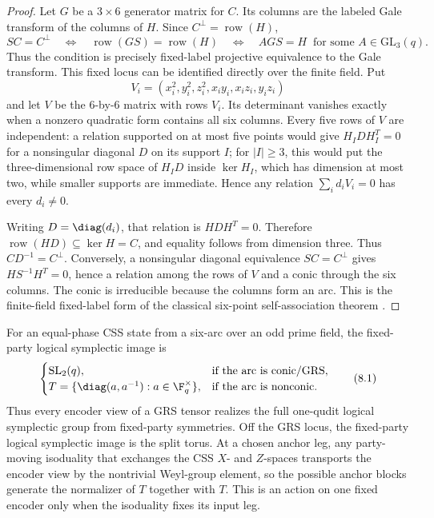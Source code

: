 \begin{proof}
Let \(G\) be a \(3\times6\) generator matrix for \(C\).  Its columns are
the labeled Gale transform of the columns of \(H\).  Since
\(C^\perp=\operatorname{row}(H)\),
\[
 SC=C^\perp
 \quad\Longleftrightarrow\quad
 \operatorname{row}(GS)=\operatorname{row}(H)
 \quad\Longleftrightarrow\quad
 AGS=H\ \text{ for some }A\in\mathrm{GL}_3(q).
\]
Thus the condition is precisely fixed-label projective equivalence to the
Gale transform.  This fixed locus can be identified directly over the
finite field.  Put
\[
 V_i=(x_i^2,y_i^2,z_i^2,x_iy_i,x_iz_i,y_iz_i)
\]
and let \(V\) be the \(6\)-by-\(6\) matrix with rows \(V_i\).
Its determinant vanishes exactly when a nonzero quadratic form contains
all six columns.  Every five rows of \(V\) are independent: a relation
supported on at most five points would give
\(H_I D H_I^T=0\) for a nonsingular diagonal \(D\) on its support \(I\);
for \(|I|\geq3\), this would put the three-dimensional row space of
\(H_I D\) inside \(\ker H_I\), which has dimension at most two, while
smaller supports are immediate.  Hence any relation
\(\sum_i d_i V_i=0\) has every \(d_i\ne0\).

Writing \(D=\diag(d_i)\), that relation is \(HDH^T=0\).  Therefore
\(\operatorname{row}(HD)\subseteq\ker H=C\), and equality follows from
dimension three.  Thus \(CD^{-1}=C^\perp\).  Conversely, a nonsingular
diagonal equivalence \(SC=C^\perp\) gives
\(HS^{-1}H^T=0\), hence a relation among the rows of \(V\) and a conic
through the six columns.  The conic is irreducible because the columns
form an arc.  This is the finite-field fixed-label form of the classical
six-point self-association theorem
\cite[Section~2.3]{HowardMillsonSnowdenVakil2008}.
\end{proof}

\begin{theorem}\label{thm:logical-phase}
For an equal-phase CSS state from a six-arc over an odd prime field, the
fixed-party logical symplectic image is
\[
\begin{cases}
\mathrm{SL}_2(q),&\text{if the arc is conic/GRS},\\
T=\{\diag(a,a^{-1}):a\in\F_q^\times\},&\text{if the arc is nonconic}.
\end{cases}                                             \tag{8.1}
\]
Thus every encoder view of a GRS tensor realizes the full one-qudit
logical symplectic group from fixed-party symmetries.  Off the GRS locus,
the fixed-party logical symplectic image is the split torus.  At a chosen
anchor leg, any party-moving isoduality that exchanges the CSS \(X\)- and
\(Z\)-spaces transports the encoder view by the nontrivial Weyl-group
element, so the possible anchor blocks generate the normalizer of \(T\)
together with \(T\).  This is an action on one fixed encoder only when
the isoduality fixes its input leg.
\end{theorem}

